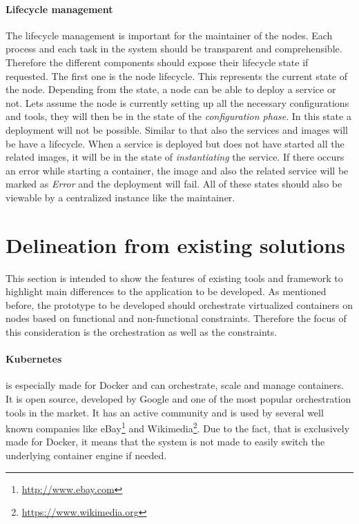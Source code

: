 \paragraph{Lifecycle management}
The lifecycle management is important for the maintainer of the nodes.
Each process and each task in the system should be transparent and comprehensible.
Therefore the different components should expose their lifecycle state if requested.
The first one is the node lifecycle.
This represents the current state of the node.
Depending from the state, a node can be able to deploy a service or not.
Lets assume the node is currently setting up all the necessary configurations and tools, they will then be in the state of the \textit{configuration phase}.
In this state a deployment will not be possible.
Similar to that also the services and images will be have a lifecycle.
When a service is deployed but does not have started all the related images, it will be in the state of \textit{instantiating} the service.
If there occurs an error while starting a container, the image and also the related service will be marked as \textit{Error} and the deployment will fail.
All of these states should also be viewable by a centralized instance like the maintainer.


\section{Delineation from existing solutions}
\label{section:delineation-from-existing-solutions}
This section is intended to show the features of existing tools and framework to highlight main differences to the application to be developed.
As mentioned before, the prototype to be developed should orchestrate virtualized containers on nodes based on functional and non-functional constraints.
Therefore the focus of this consideration is the orchestration as well as the constraints.

\paragraph{Kubernetes} is especially made for Docker and can orchestrate, scale and manage containers.
It is open source, developed by Google and one of the most popular orchestration tools in the market.
It has an active community and is used by several well known companies\autocite{Kubernetes:Case-Studies} like eBay\footnote{\url{http://www.ebay.com}} and Wikimedia\footnote{\url{https://www.wikimedia.org}}.
Due to the fact, that is exclusively made for Docker, it means that the system is not made to easily switch the underlying container engine if needed.

